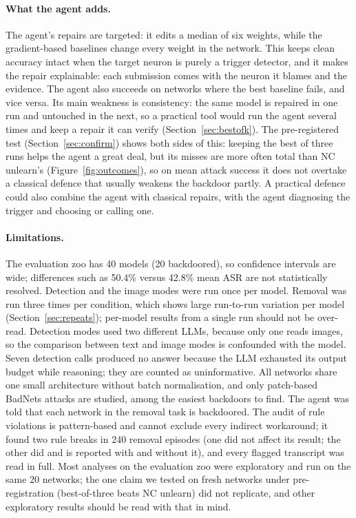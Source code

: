 \documentclass[11pt]{article}
\begin{document}
\paragraph{What the agent adds.}
The agent's repairs are targeted: it edits a median of six weights, while the gradient-based baselines
change every weight in the network. This keeps clean accuracy intact when the target neuron is purely
a trigger detector, and it makes the repair explainable: each submission comes with the neuron it
blames and the evidence. The agent also succeeds on networks where the best baseline fails, and vice
versa. Its main weakness is consistency: the same model is repaired in one run and untouched in the next,
so a practical tool would run the agent several times and keep a repair it can verify
(Section~\ref{sec:bestofk}). The pre-registered test (Section~\ref{sec:confirm}) shows both sides of
this: keeping the best of three runs helps the agent a great deal, but its misses are more often total
than NC unlearn's (Figure~\ref{fig:outcomes}), so on mean attack success it does not overtake a classical
defence that usually weakens the backdoor partly. A practical defence could also combine the agent with classical repairs,
with the agent diagnosing the trigger and choosing or calling one.

\paragraph{Limitations.}
The evaluation zoo has 40 models (20 backdoored), so confidence intervals are wide; differences such as
50.4\% versus 42.8\% mean ASR are not statistically resolved. Detection and the image modes were run
once per model. Removal was run three times per condition, which shows large run-to-run variation per
model (Section~\ref{sec:repeats}); per-model results from a single run should not be over-read. Detection modes used two different LLMs,
because only one reads images, so the comparison between text and image modes is confounded with the
model. Seven detection calls produced no answer because the LLM exhausted its output budget while
reasoning; they are counted as uninformative. All networks share one small architecture without batch
normalisation, and only patch-based BadNets attacks are studied, among the easiest backdoors to find.
The agent was told that each network in the removal task is backdoored. The audit of rule violations is
pattern-based and cannot exclude every indirect workaround; it found two rule breaks in 240 removal
episodes (one did not affect its result; the other did and is reported with and without it), and every
flagged transcript was read in full. Most analyses on the evaluation zoo were exploratory and run on the
same 20 networks; the one claim we tested on fresh networks under pre-registration (best-of-three beats NC
unlearn) did not replicate, and other exploratory results should be read with that in mind.
\end{document}

